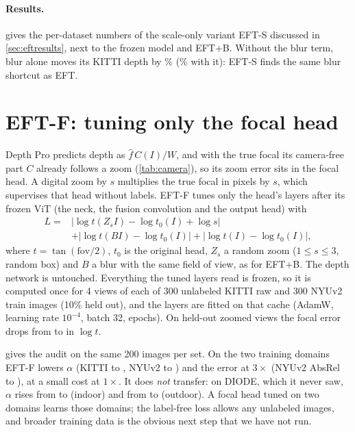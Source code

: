 \documentclass[10pt,twocolumn,letterpaper]{article}
\begin{document}
\paragraph{Results.}  gives the per-dataset numbers of the scale-only variant EFT-S discussed in
\cref{sec:eftresults}, next to the frozen model and EFT+B. Without the blur term, blur alone moves its KITTI depth by
\DavTwoSScalenbKittiBlur\% (\DavTwoSScaleKittiBlur\% with it): EFT-S finds the same blur shortcut as EFT.



\section{EFT-F: tuning only the focal head}\label{sec:supp_eftf}

Depth Pro predicts depth as $\hat f\,C(I)/W$, and with the true focal its camera-free part $C$ already follows
a zoom (\cref{tab:camera}), so its zoom error sits in the focal head. A digital zoom by $s$ multiplies the
true focal in pixels by $s$, which supervises that head without labels. EFT-F tunes only the head's layers
after its frozen ViT (the neck, the fusion convolution and the output head) with
\begin{equation*}
\begin{aligned}
L={}&\bigl|\log t(Z_sI)-\log t_0(I)+\log s\bigr|\\
&+\bigl|\log t(BI)-\log t_0(I)\bigr|+\bigl|\log t(I)-\log t_0(I)\bigr|,
\end{aligned}
\end{equation*}
where $t=\tan(\mathrm{fov}/2)$, $t_0$ is the original head, $Z_s$ a random zoom ($1\le s\le3$, random box) and
$B$ a blur with the same field of view, as for EFT+B. The depth network is untouched. Everything the tuned
layers read is frozen, so it is computed once for 4 views of each of 300 unlabeled KITTI raw and 300 NYUv2
train images (10\% held out), and the layers are fitted on that cache (AdamW, learning rate $10^{-4}$, batch
32, \eftfEpochs{} epochs). On held-out zoomed views the focal error drops from \eftfValZoomBefore{} to
\eftfValZoomAfter{} in $\log t$.

 gives the audit on the same 200 images per set. On the two training domains EFT-F lowers
$\alpha$ (KITTI \DepthproFheadKittiAlpha{} to \DepthproEftfFheadKittiAlpha, NYUv2 \DepthproFheadNyuAlpha{} to
\DepthproEftfFheadNyuAlpha) and the error at $3\times$ (NYUv2 AbsRel \DepthproFheadNyuAbsrelThree{} to
\DepthproEftfFheadNyuAbsrelThree), at a small cost at $1\times$. It does \emph{not} transfer: on DIODE, which it
never saw, $\alpha$ rises from \DepthproFheadDiodeInAlpha{} to \DepthproEftfFheadDiodeInAlpha{} (indoor) and from
\DepthproFheadDiodeOutAlpha{} to \DepthproEftfFheadDiodeOutAlpha{} (outdoor). A focal head tuned on two domains learns those
domains; the label-free loss allows any unlabeled images, and broader training data is the obvious next step
that we have not run.
\end{document}
